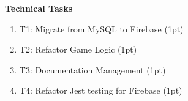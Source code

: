\textbf{Technical Tasks}

\begin{enumerate}
    \item {T1: Migrate from MySQL to Firebase (1pt)}
    \item {T2: Refactor Game Logic (1pt)}
    \item {T3: Documentation Management (1pt)}
    \item {T4: Refactor Jest testing for Firebase (1pt)}
\end{enumerate}